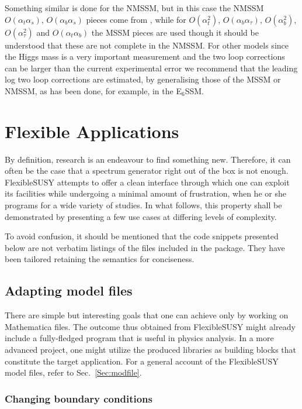 \documentclass[final,3p,11pt,pdflatex]{elsarticle}
\makeatletter
\newcommand{\fs}{FlexibleSUSY\@\xspace}
\newcommand{\mathematica}{Mathematica\xspace}
\newcommand{\secref}[1]{Sec.~\ref{#1}}
\def\at{\alpha_t}
\def\ab{\alpha_b}
\def\as{\alpha_s}
\def\atau{\alpha_{\tau}}
\def\oatab{O(\at\ab)}
\def\oatas{O(\at\as)}
\def\oabas{O(\ab\as)}
\def\oatq{O(\at^2)}
\def\oabq{O(\ab^2)}
\def\oatauq{O(\atau^2)}
\def\oabatau{O(\ab \atau)}
\makeatother
\begin{document}
Something similar is done for the NMSSM, but in this case the NMSSM
$\oatas$, $\oabas$ pieces come from \cite{Degrassi:2009yq}, while for
$\oatq$, $\oabatau$, $\oabq$, $\oatauq$ and $\oatab$ the MSSM pieces
are used though it should be understood that these are not complete in
the NMSSM. For other models since the Higgs mass is a very important
measurement and the two loop corrections can be larger than the
current experimental error \cite{Degrassi:2009yq} we recommend that
the leading log two loop corrections are estimated, by generalising
those of the MSSM or NMSSM, as has been done, for example, in the
E$_6$SSM\cite{King:2005jy}.

\section{Flexible Applications}
\label{Sec:Flexible}

By definition, research is an endeavour to find something new.
Therefore, it can often be the case that
a spectrum generator right out of the box is not enough.
\fs attempts to offer a clean interface through which
one can exploit its facilities
while undergoing a minimal amount of frustration,
when he or she programs for a wide variety of studies.
In what follows,
this property shall be demonstrated by presenting a few use cases
at differing levels of complexity.

To avoid confusion,
it should be mentioned that
the code snippets presented below are not
verbatim listings of the files included in the package.
They have been tailored retaining the semantics
for conciseness.

\subsection{Adapting model files}

There are simple but interesting goals
that one can achieve only by working on
\mathematica files.
The outcome thus obtained from \fs
might already include a fully-fledged program
that is useful in physics analysis.
In a more advanced project,
one might utilize the produced libraries as building blocks
that constitute the target application.
For a general account of the \fs model files,
refer to \secref{Sec:modfile}.

\subsubsection{Changing boundary conditions}
\end{document}
